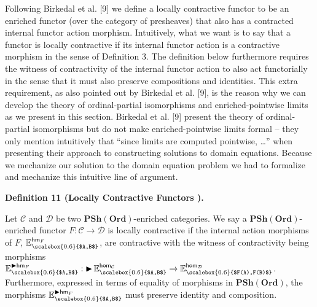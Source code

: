  
 
 
Following Birkedal et al. [9] we define a locally contractive functor to be an enriched functor (over the category of presheaves) that also has a contracted internal functor action morphism. Intuitively, what we want is to say that a functor is locally contractive if its internal functor action is a contractive morphism in the sense of Definition 3. The definition below furthermore requires the witness of contractivity of the internal functor action to also act functorially in the sense that it must also preserve compositions and identities. This extra requirement, as also pointed out by Birkedal et al. [9], is the reason why we can develop the theory of ordinal-partial isomorphisms and enriched-pointwise limits as we present in this section. Birkedal et al. [9] present the theory of ordinal-partial isomorphisms but do not make enriched-pointwise limits formal – they only mention intuitively that “since limits are computed pointwise, …” when presenting their approach to constructing solutions to domain equations. Because we mechanize our solution to the domain equation problem we had to formalize and mechanize this intuitive line of argument.\par
 
 
 
\par\medskip\noindent\textbf{Definition 11 (Locally Contractive Functors ).}\par
 
 
Let $\mathcal{C}$ and $\mathcal{D}$ be two $\mathbf{PSh}(\mathbf{Ord})$-enriched categories. We say a $\mathbf{PSh}(\mathbf{Ord})$-enriched functor $F:\mathcal{C}\to\mathcal{D}$ is locally contractive if the internal action morphisms of $F$, $\mathbb{E}^{\mathsf{hm}_{F}}_{\scalebox{0.6}{$A,B$}}$, are contractive with the witness of contractivity being morphisms $\mathbb{E}^{\mathop{\blacktriangleright}{}\!\mathsf{hm}_{F}}_{\scalebox{0.6}{$A,B$}}:\mathop{\blacktriangleright}\mathbb{E}^{\mathsf{hom}_{\mathcal{C}}}_{\scalebox{0.6}{$A,B$}}\to\mathbb{E}^{\mathsf{hom}_{\mathcal{D}}}_{\scalebox{0.6}{$F(A),F(B)$}}$. Furthermore, expressed in terms of equality of morphisms in $\mathbf{PSh}(\mathbf{Ord})$, the morphisms $\mathbb{E}^{\mathop{\blacktriangleright}{}\!\mathsf{hm}_{F}}_{\scalebox{0.6}{$A,B$}}$ must preserve identity and composition.\par
 
